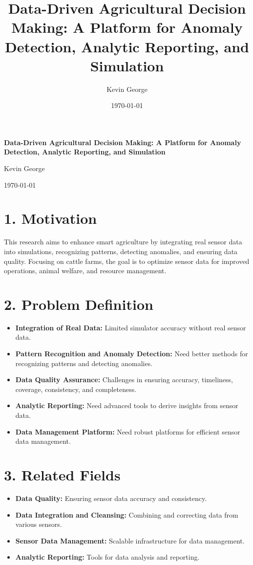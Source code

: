 \documentclass[12pt]{article}
\title{Data-Driven Agricultural Decision Making: A Platform for Anomaly Detection, Analytic Reporting, and Simulation}
\author{Kevin George}
\date{\today}
\begin{document}
\begin{titlepage}
    \centering
    \vspace*{1in}  %
    \huge\textbf{Data-Driven Agricultural Decision Making: A Platform for Anomaly Detection, Analytic Reporting, and Simulation}\par
    \vspace{1in}
    \Large Kevin George\par
    \vspace{0.5in}
    \large \today
    \thispagestyle{empty}
\end{titlepage}

\section*{1. Motivation}
This research aims to enhance smart agriculture by integrating real sensor data into simulations, recognizing patterns, detecting anomalies, and ensuring data quality. Focusing on cattle farms, the goal is to optimize sensor data for improved operations, animal welfare, and resource management.

\section*{2. Problem Definition}
\begin{itemize}
    \item \textbf{Integration of Real Data:} Limited simulator accuracy without real sensor data.
    \item \textbf{Pattern Recognition and Anomaly Detection:} Need better methods for recognizing patterns and detecting anomalies.
    \item \textbf{Data Quality Assurance:} Challenges in ensuring accuracy, timeliness, coverage, consistency, and completeness.
    \item \textbf{Analytic Reporting:} Need advanced tools to derive insights from sensor data.
    \item \textbf{Data Management Platform:} Need robust platforms for efficient sensor data management.
\end{itemize}

\section*{3. Related Fields}
\begin{itemize}
    \item \textbf{Data Quality:} Ensuring sensor data accuracy and consistency.
    \item \textbf{Data Integration and Cleansing:} Combining and correcting data from various sensors.
    \item \textbf{Sensor Data Management:} Scalable infrastructure for data management.
    \item \textbf{Analytic Reporting:} Tools for data analysis and reporting.
\end{itemize}
\end{document}
